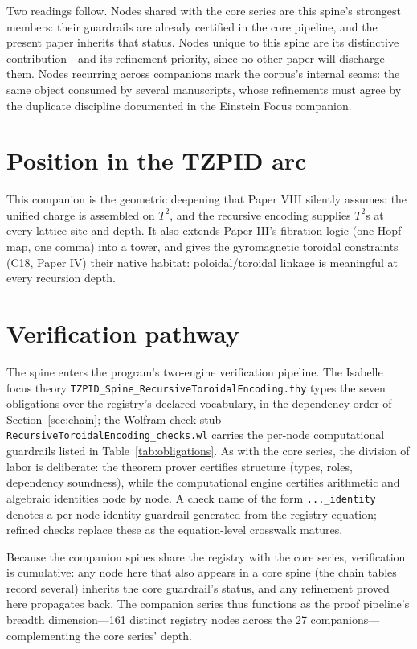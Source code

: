 \documentclass[11pt]{article}
\theoremstyle{remark}
\begin{document}
Two readings follow. Nodes shared with the core series are this spine's strongest members: their guardrails are already certified in the core pipeline, and the present paper inherits that status. Nodes unique to this spine are its distinctive contribution---and its refinement priority, since no other paper will discharge them. Nodes recurring across companions mark the corpus's internal seams: the same object consumed by several manuscripts, whose refinements must agree by the duplicate discipline documented in the Einstein Focus companion.

\section{Position in the TZPID arc}
\label{sec:arc}

This companion is the geometric deepening that Paper VIII silently assumes: the unified charge is assembled on $T^2$, and the recursive encoding supplies $T^2$s at every lattice site and depth. It also extends Paper III's fibration logic (one Hopf map, one comma) into a tower, and gives the gyromagnetic toroidal constraints (C18, Paper IV) their native habitat: poloidal/toroidal linkage is meaningful at every recursion depth.

\section{Verification pathway}
\label{sec:verify}

The spine enters the program's two-engine verification pipeline. The Isabelle focus theory \texttt{TZPID\_Spine\_RecursiveToroidalEncoding.thy} types the seven obligations over the registry's declared vocabulary, in the dependency order of Section~\ref{sec:chain}; the Wolfram check stub \texttt{RecursiveToroidalEncoding\_checks.wl} carries the per-node computational guardrails listed in Table~\ref{tab:obligations}. As with the core series, the division of labor is deliberate: the theorem prover certifies structure (types, roles, dependency soundness), while the computational engine certifies arithmetic and algebraic identities node by node. A check name of the form \texttt{...\_identity} denotes a per-node identity guardrail generated from the registry equation; refined checks replace these as the equation-level crosswalk matures.

Because the companion spines share the registry with the core series, verification is cumulative: any node here that also appears in a core spine (the chain tables record several) inherits the core guardrail's status, and any refinement proved here propagates back. The companion series thus functions as the proof pipeline's breadth dimension---161 distinct registry nodes across the 27 companions---complementing the core series' depth.
\end{document}
